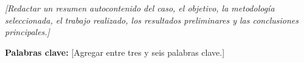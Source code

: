 \noindent\textit{[Redactar un resumen autocontenido del caso, el objetivo, la
metodología seleccionada, el trabajo realizado, los resultados preliminares y
las conclusiones principales.]}

\vfill
\noindent\textbf{Palabras clave:} [Agregar entre tres y seis palabras clave.]